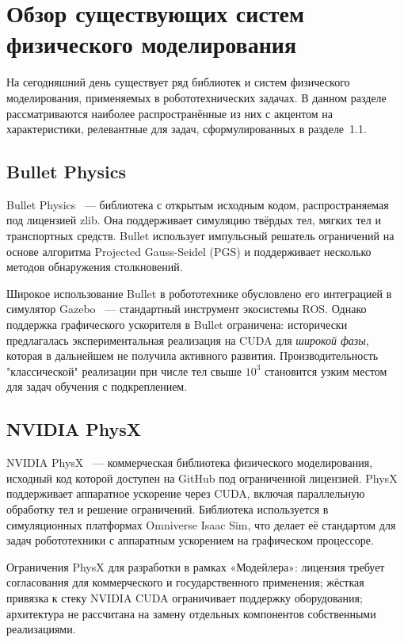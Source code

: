 \section{Обзор существующих систем физического моделирования}

На сегодняшний день существует ряд библиотек и систем физического моделирования, применяемых в 
робототехнических задачах. В данном разделе рассматриваются наиболее распространённые из них с акцентом на 
характеристики, релевантные для задач, сформулированных в разделе~1.1.

\subsection{Bullet Physics}

Bullet Physics~\cite{coumans2015bullet} --- библиотека с открытым исходным кодом, распространяемая под лицензией 
zlib. Она поддерживает симуляцию твёрдых тел, мягких тел и транспортных средств. Bullet использует импульсный 
решатель ограничений на основе алгоритма Projected Gauss-Seidel (PGS) и поддерживает несколько методов 
обнаружения столкновений.

Широкое использование Bullet в робототехнике обусловлено его интеграцией в симулятор 
Gazebo~\cite{koenig2004design} --- стандартный инструмент экосистемы ROS. Однако поддержка графического 
ускорителя в Bullet ограничена: исторически предлагалась экспериментальная реализация на CUDA для 
\textit{широкой фазы}, которая в дальнейшем не получила активного развития. Производительность "классической" 
реализации при числе тел свыше $10^3$ становится узким местом для задач обучения с подкреплением.

\subsection{NVIDIA PhysX}

NVIDIA PhysX~\cite{physx2023} --- коммерческая библиотека физического моделирования, исходный код которой 
доступен на GitHub под ограниченной лицензией. PhysX поддерживает аппаратное ускорение через CUDA, включая 
параллельную обработку тел и решение ограничений. Библиотека используется в симуляционных платформах Omniverse 
Isaac Sim, что делает её стандартом для задач робототехники с аппаратным ускорением на графическом процессоре.

Ограничения PhysX для разработки в рамках «Модейлера»: лицензия требует согласования для коммерческого и 
государственного применения; жёсткая привязка к стеку NVIDIA CUDA ограничивает поддержку оборудования; 
архитектура не рассчитана на замену отдельных компонентов собственными реализациями.

